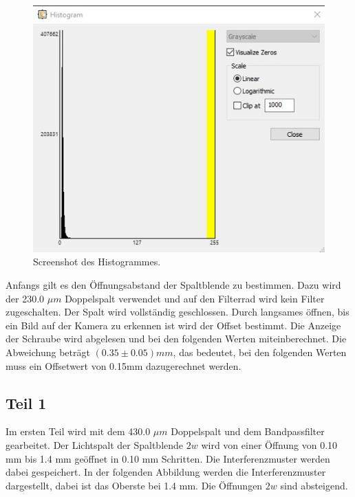 \documentclass[12pt,a4paper,twoside]{article}
\begin{document}
\begin{figure}[H]
    \centering
    \includegraphics[width=0.6\linewidth]{nudes/histogramm.jpg}
    \caption{Screenshot des Histogrammes. }
    \label{fig:histogram}
\end{figure}

\noindent
Anfangs gilt es den Öffnungsabstand der Spaltblende zu bestimmen. Dazu wird der 230.0 $\mu m$ Doppelspalt verwendet und auf den Filterrad wird kein Filter zugeschalten. 
Der Spalt wird vollständig geschlossen. Durch langsames öffnen, bis ein Bild auf der Kamera zu erkennen ist wird der Offset bestimmt. Die Anzeige der Schraube wird abgelesen und bei den folgenden Werten miteinberechnet. 
Die Abweichung beträgt $(0.35 \pm 0.05) mm$, das bedeutet, bei den folgenden Werten muss ein Offsetwert von 0.15mm dazugerechnet werden. 

\subsection{Teil 1}
Im ersten Teil wird mit dem 430.0 $\mu m$ Doppelspalt und dem Bandpassfilter gearbeitet. 
Der Lichtspalt der Spaltblende $2w$ wird von einer Öffnung von 0.10 mm bis 1.4 mm geöffnet in 0.10 mm Schritten. Die Interferenzmuster werden dabei gespeichert. 
In der folgenden Abbildung werden die Interferenzmuster dargestellt, dabei ist das Oberste bei 1.4 mm. Die Öffnungen $2w$ sind absteigend. 
\end{document}
